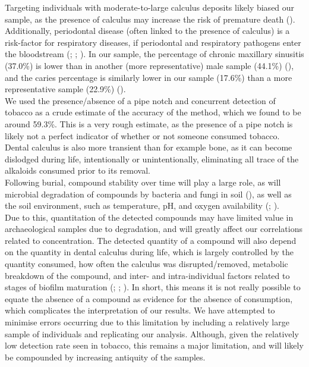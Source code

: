 \documentclass[
  b5paper,
]{book}
\begin{document}
Targeting individuals with moderate-to-large calculus deposits likely
biased our sample, as the presence of calculus may increase the risk of
premature death (). Additionally, periodontal disease (often linked to the
presence of calculus) is a risk-factor for respiratory diseases, if
periodontal and respiratory pathogens enter the bloodstream
(; ;
). In our sample, the percentage of chronic maxillary sinusitis
(37.0\%) is lower than in another (more representative) male sample
(44.1\%) (), and the caries percentage is similarly lower in our sample
(17.6\%) than a more representative sample (22.9\%)
().\\
We used the presence/absence of a pipe notch and concurrent detection of
tobacco as a crude estimate of the accuracy of the method, which we
found to be around 59.3\%. This is a very rough estimate, as the
presence of a pipe notch is likely not a perfect indicator of whether or
not someone consumed tobacco. Dental calculus is also more transient
than for example bone, as it can become dislodged during life,
intentionally or unintentionally, eliminating all trace of the alkaloids
consumed prior to its removal.\\
Following burial, compound stability over time will play a large role,
as will microbial degradation of compounds by bacteria and fungi in soil
(), as well as the soil environment, such as temperature, pH, and
oxygen availability (; ).\\
Due to this, quantitation of the detected compounds may have limited
value in archaeological samples due to degradation, and will greatly
affect our correlations related to concentration. The detected quantity
of a compound will also depend on the quantity in dental calculus during
life, which is largely controlled by the quantity consumed, how often
the calculus was disrupted/removed, metabolic breakdown of the compound,
and inter- and intra-individual factors related to stages of biofilm
maturation (; ; ). In short, this means it is not really possible to equate the
absence of a compound as evidence for the absence of consumption, which
complicates the interpretation of our results. We have attempted to
minimise errors occurring due to this limitation by including a
relatively large sample of individuals and replicating our analysis.
Although, given the relatively low detection rate seen in tobacco, this
remains a major limitation, and will likely be compounded by increasing
antiquity of the samples.
\end{document}
